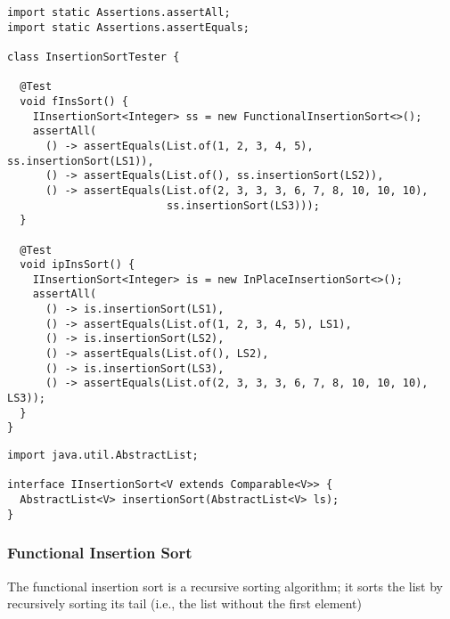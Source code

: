 \begin{lstlisting}[language=MyJava]
import static Assertions.assertAll;
import static Assertions.assertEquals;

class InsertionSortTester {

  @Test
  void fInsSort() {
    IInsertionSort<Integer> ss = new FunctionalInsertionSort<>();
    assertAll(
      () -> assertEquals(List.of(1, 2, 3, 4, 5), ss.insertionSort(LS1)),
      () -> assertEquals(List.of(), ss.insertionSort(LS2)),
      () -> assertEquals(List.of(2, 3, 3, 3, 6, 7, 8, 10, 10, 10), 
                         ss.insertionSort(LS3)));
  }

  @Test
  void ipInsSort() {
    IInsertionSort<Integer> is = new InPlaceInsertionSort<>();
    assertAll(
      () -> is.insertionSort(LS1),
      () -> assertEquals(List.of(1, 2, 3, 4, 5), LS1),
      () -> is.insertionSort(LS2),
      () -> assertEquals(List.of(), LS2),
      () -> is.insertionSort(LS3),
      () -> assertEquals(List.of(2, 3, 3, 3, 6, 7, 8, 10, 10, 10), LS3));
  }
}
\end{lstlisting}

\begin{lstlisting}[language=MyJava]
import java.util.AbstractList;

interface IInsertionSort<V extends Comparable<V>> {
  AbstractList<V> insertionSort(AbstractList<V> ls);
}
\end{lstlisting}

\subsubsection*{Functional Insertion Sort}

The functional insertion sort is a recursive sorting algorithm; it sorts the list by recursively sorting its tail (i.e., the list without the first element)

